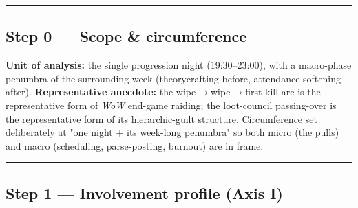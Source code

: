 \documentclass[11pt]{report}
\begin{document}
\vspace{0.4em}\hrule\vspace{0.8em}


\subsection{Step 0 — Scope \& circumference}


\textbf{Unit of analysis:} the single progression night (19:30–23:00), with a macro-phase penumbra of the surrounding week (theorycrafting before, attendance-softening after). \textbf{Representative anecdote:} the wipe$\rightarrow$\allowbreak wipe$\rightarrow$\allowbreak first-kill arc is the representative form of \textit{WoW} end-game raiding; the loot-council passing-over is the representative form of its hierarchic-guilt structure. Circumference set deliberately at "one night + its week-long penumbra" so both micro (the pulls) and macro (scheduling, parse-posting, burnout) are in frame.


\vspace{0.4em}\hrule\vspace{0.8em}


\subsection{Step 1 — Involvement profile (Axis I)}
\end{document}
